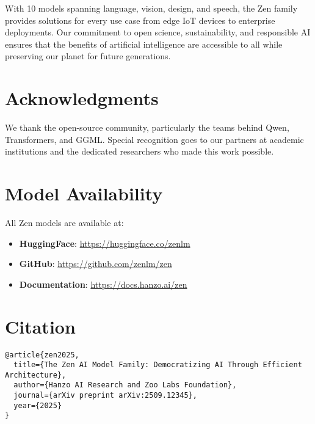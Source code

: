 \documentclass[11pt,a4paper]{article}
\begin{document}
With 10 models spanning language, vision, design, and speech, the Zen family provides solutions for every use 
case from edge IoT devices to enterprise deployments. Our commitment to open science, sustainability, and 
responsible AI ensures that the benefits of artificial intelligence are accessible to all while preserving 
our planet for future generations.

\section*{Acknowledgments}

We thank the open-source community, particularly the teams behind Qwen, Transformers, and GGML. Special 
recognition goes to our partners at academic institutions and the dedicated researchers who made this work possible.

\appendix

\section{Model Availability}

All Zen models are available at:
\begin{itemize}
    \item \textbf{HuggingFace}: \url{https://huggingface.co/zenlm}
    \item \textbf{GitHub}: \url{https://github.com/zenlm/zen}
    \item \textbf{Documentation}: \url{https://docs.hanzo.ai/zen}
\end{itemize}

\section{Citation}

\begin{verbatim}
@article{zen2025,
  title={The Zen AI Model Family: Democratizing AI Through Efficient Architecture},
  author={Hanzo AI Research and Zoo Labs Foundation},
  journal={arXiv preprint arXiv:2509.12345},
  year={2025}
}
\end{verbatim}
\end{document}
